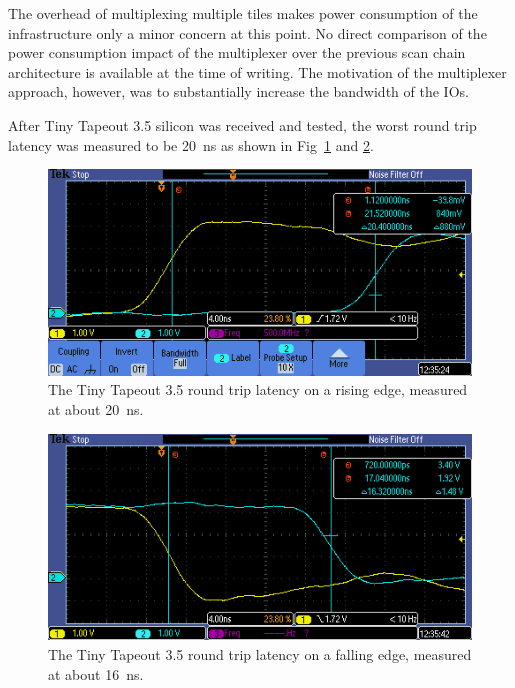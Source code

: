 The overhead of multiplexing multiple tiles makes power consumption of the infrastructure only a minor concern at this point. No direct comparison of the power consumption impact of the multiplexer over the previous scan chain architecture is available at the time of writing. The motivation of the multiplexer approach, however, was to substantially increase the bandwidth of the IOs.

After Tiny Tapeout 3.5 silicon was received and tested, the worst round trip latency was measured to be \qty{20}{\ns} as shown in Fig~\ref{fig:round_trip_latency_rising_edge} and \ref{fig:round_trip_latency_falling_edge}.

\begin{figure}[!t]
\centering
\includegraphics[width=\columnwidth]{./Figs/tt3p5 rising latency.PNG}
\caption{The Tiny Tapeout 3.5 round trip latency on a rising edge, measured at about \qty{20}{\ns}.}
\label{fig:round_trip_latency_rising_edge}
\end{figure}

\begin{figure}[!t]
\centering
\includegraphics[width=\columnwidth]{./Figs/tt3p5 falling latency.PNG}
\caption{The Tiny Tapeout 3.5 round trip latency on a falling edge, measured at about \qty{16}{\ns}.}
\label{fig:round_trip_latency_falling_edge}
\end{figure}

